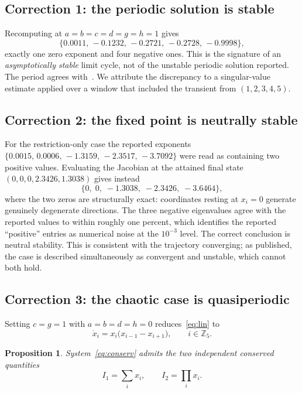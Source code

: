 \documentclass[11pt]{article}
\newcommand{\Z}{{\mathbb{Z}}}
\newtheorem{proposition}[theorem]{Proposition}
\begin{document}
\subsection{Correction 1: the periodic solution is stable}

Recomputing at $a=b=c=d=g=h=1$ gives
\[
\{0.0011,\,-0.1232,\,-0.2721,\,-0.2728,\,-0.9998\},
\]
exactly one zero exponent and four negative ones. This is the signature of an
\emph{asymptotically stable} limit cycle, not of the unstable periodic solution
reported. The period agrees with~\cite{Lin2020}. We attribute the discrepancy to
a singular-value estimate applied over a window that included the transient
from $(1,2,3,4,5)$.

\subsection{Correction 2: the fixed point is neutrally stable}

For the restriction-only case the reported exponents
$\{0.0015,\,0.0006,\,-1.3159,\,-2.3517,\,-3.7092\}$ were read as containing two
positive values. Evaluating the Jacobian at the attained final state
$(0,0,0,2.3426,1.3038)$ gives instead
\[
\{0,\;0,\;-1.3038,\;-2.3426,\;-3.6464\},
\]
where the two zeros are structurally exact: coordinates resting at $x_i=0$
generate genuinely degenerate directions. The three negative eigenvalues agree
with the reported values to within roughly one percent, which identifies the
reported ``positive'' entries as numerical noise at the $10^{-3}$ level. The
correct conclusion is neutral stability. This is consistent with the trajectory
converging; as published, the case is described simultaneously as convergent and
unstable, which cannot both hold.

\subsection{Correction 3: the chaotic case is quasiperiodic}

Setting $c=g=1$ with $a=b=d=h=0$ reduces~\eqref{eq:lin} to
\begin{equation}\label{eq:conserv}
\dot x_i = x_i\bigl(x_{i-1}-x_{i+1}\bigr), \qquad i\in\Z_5 .
\end{equation}

\begin{proposition}\label{prop:conserved}
System~\eqref{eq:conserv} admits the two independent conserved quantities
\[
I_1=\sum_{i} x_i, \qquad I_2=\prod_{i} x_i .
\]
\end{proposition}
\end{document}
